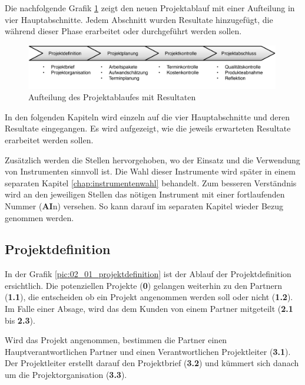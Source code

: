 Die nachfolgende Grafik \ref{pic:01_projektablauf} zeigt den neuen Projektablauf 
mit einer Aufteilung in vier Hauptabschnitte. Jedem Abschnitt wurden Resultate
hinzugefügt, die während dieser Phase erarbeitet oder durchgeführt werden sollen.

\begin{figure}[htbp]
\begin{center}
\includegraphics[width=0.99\textwidth,angle=0]{./bilder/loesung/01_projektablauf.pdf}
\caption[Aufteilung des Projektablaufes mit Resultaten]{Aufteilung des Projektablaufes mit Resultaten\footnotemark}
\label{pic:01_projektablauf}
\end{center}
\end{figure}

In den folgenden Kapiteln wird einzeln auf die vier Hauptabschnitte und deren
Resultate eingegangen. Es wird aufgezeigt, wie die jeweils erwarteten Resultate 
erarbeitet werden sollen.

Zusätzlich werden die Stellen hervorgehoben, wo der Einsatz und die Verwendung 
von Instrumenten sinnvoll ist. Die Wahl dieser Instrumente wird später in einem
separaten Kapitel \ref{chap:instrumentenwahl} behandelt. Zum besseren Verständnis
wird an den jeweiligen Stellen das nötigen Instrument mit einer fortlaufenden
Nummer (\textbf{AI}n) versehen. So kann darauf im separaten Kapitel wieder Bezug 
genommen werden.

\subsection{Projektdefinition}
In der Grafik \ref{pic:02_01_projektdefinition} ist der Ablauf der Projektdefinition 
ersichtlich. Die potenziellen Projekte (\textbf{0}) gelangen weiterhin zu den
Partnern (\textbf{1.1}), die entscheiden ob ein Projekt angenommen werden soll
oder nicht (\textbf{1.2}). Im Falle einer Absage, wird das dem Kunden von einem
Partner mitgeteilt (\textbf{2.1} bis \textbf{2.3}).

Wird das Projekt angenommen, bestimmen die Partner einen Hauptverantwortlichen
Partner und einen Verantwortlichen Projektleiter (\textbf{3.1}). Der Projektleiter
erstellt darauf den Projektbrief (\textbf{3.2}) und kümmert sich danach um
die Projektorganisation (\textbf{3.3}).

